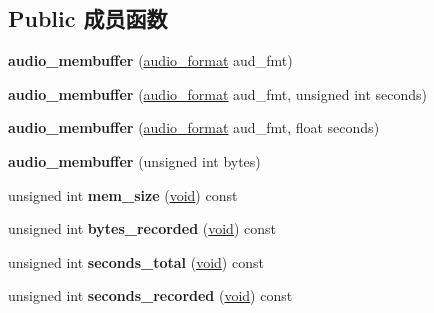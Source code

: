 \subsection*{Public 成员函数}
\begin{DoxyCompactItemize}
\item 
\mbox{\label{classaudio__membuffer_abc0be2ef387f98dcdc0760bf59e78ad6}} 
{\bfseries audio\+\_\+membuffer} (\hyperlink{classaudio__format}{audio\+\_\+format} aud\+\_\+fmt)
\item 
\mbox{\label{classaudio__membuffer_a36875162ebac3ced997f7945d1481f0f}} 
{\bfseries audio\+\_\+membuffer} (\hyperlink{classaudio__format}{audio\+\_\+format} aud\+\_\+fmt, unsigned int seconds)
\item 
\mbox{\label{classaudio__membuffer_a330358fe9f7e19386754b3cbdf4eb72d}} 
{\bfseries audio\+\_\+membuffer} (\hyperlink{classaudio__format}{audio\+\_\+format} aud\+\_\+fmt, float seconds)
\item 
\mbox{\label{classaudio__membuffer_ad9a94d5b554055a2e5377b6b77959bc5}} 
{\bfseries audio\+\_\+membuffer} (unsigned int bytes)
\item 
\mbox{\label{classaudio__membuffer_aa2137ea429d47e224c963e3bf7402b39}} 
unsigned int {\bfseries mem\+\_\+size} (\hyperlink{interfacevoid}{void}) const
\item 
\mbox{\label{classaudio__membuffer_aed1f06398535b5082e62d56003ba6c3b}} 
unsigned int {\bfseries bytes\+\_\+recorded} (\hyperlink{interfacevoid}{void}) const
\item 
\mbox{\label{classaudio__membuffer_ae2363d32060e32ce1a38cfa72dab550d}} 
unsigned int {\bfseries seconds\+\_\+total} (\hyperlink{interfacevoid}{void}) const
\item 
\mbox{\label{classaudio__membuffer_aa6c38599c449392d44051b6a9cf49ff1}} 
unsigned int {\bfseries seconds\+\_\+recorded} (\hyperlink{interfacevoid}{void}) const
\item 
\mbox{\label{classaudio__membuffer_a06f57fdb82e7f01e7b2b5acf9675b20e}} 

\end{DoxyCompactItemize}
